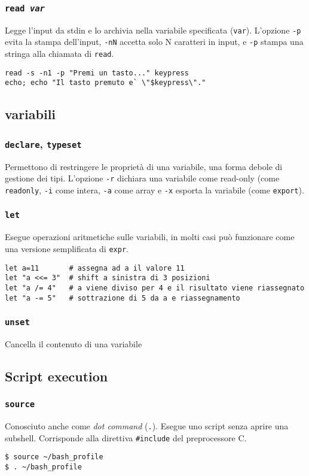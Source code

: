 \subsubsection*{\texttt{read \emph{var}}}
Legge l'input da stdin e lo archivia nella variabile specificata
(\texttt{var}). L'opzione \texttt{-p} evita la stampa dell'input,
\texttt{-nN} accetta solo N caratteri in input, e \texttt{-p} stampa una
stringa alla chiamata di \texttt{read}.
\begin{verbatim}
read -s -n1 -p "Premi un tasto..." keypress
echo; echo "Il tasto premuto e` \"$keypress\"."
\end{verbatim}

\subsection{variabili}
\subsubsection*{\texttt{declare}, \texttt{typeset}}
Permettono di restringere le propriet\`a di una variabile, una forma debole di
gestione dei tipi. L'opzione \texttt{-r} dichiara una variabile come
read-only (come \texttt{readonly}, \texttt{-i} come intera, \texttt{-a} come
array e \texttt{-x} esporta la variabile (come \texttt{export}).

\subsubsection*{\texttt{let}}
Esegue operazioni aritmetiche sulle variabili, in molti casi pu\`o funzionare
come una versione semplificata di \texttt{expr}.
\begin{verbatim}
let a=11       # assegna ad a il valore 11
let "a <<= 3"  # shift a sinistra di 3 posizioni
let "a /= 4"   # a viene diviso per 4 e il risultato viene riassegnato
let "a -= 5"   # sottrazione di 5 da a e riassegnamento
\end{verbatim}

\subsubsection*{\texttt{unset}}
Cancella il contenuto di una variabile

\subsection{Script execution}
\subsubsection*{\texttt{source}}
Conosciuto anche come \emph{dot command} (\texttt{.}). Esegue uno script senza
aprire una subshell. Corrisponde alla direttiva \verb_#include_ del
preprocessore C.
\begin{verbatim}
$ source ~/bash_profile
$ . ~/bash_profile
\end{verbatim}

